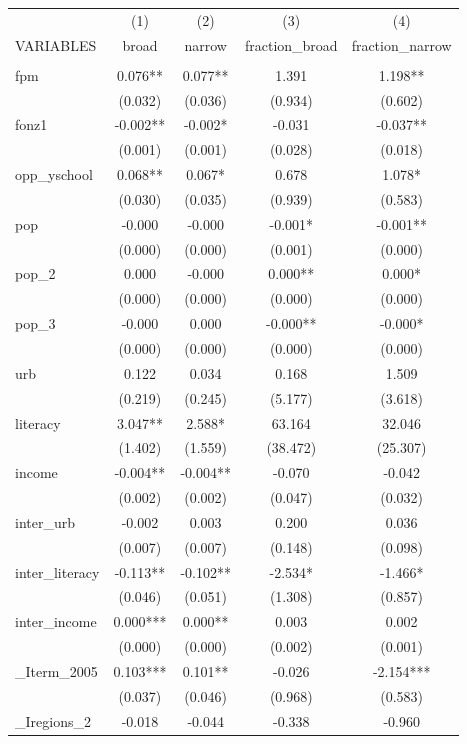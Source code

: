 \documentclass[]{article}
\begin{document}
\begin{tabular}{lcccc} \hline
 & (1) & (2) & (3) & (4) \\
VARIABLES & broad & narrow & fraction\_broad & fraction\_narrow \\ \hline
 &  &  &  &  \\
fpm & 0.076** & 0.077** & 1.391 & 1.198** \\
 & (0.032) & (0.036) & (0.934) & (0.602) \\
fonz1 & -0.002** & -0.002* & -0.031 & -0.037** \\
 & (0.001) & (0.001) & (0.028) & (0.018) \\
opp\_yschool & 0.068** & 0.067* & 0.678 & 1.078* \\
 & (0.030) & (0.035) & (0.939) & (0.583) \\
pop & -0.000 & -0.000 & -0.001* & -0.001** \\
 & (0.000) & (0.000) & (0.001) & (0.000) \\
pop\_2 & 0.000 & -0.000 & 0.000** & 0.000* \\
 & (0.000) & (0.000) & (0.000) & (0.000) \\
pop\_3 & -0.000 & 0.000 & -0.000** & -0.000* \\
 & (0.000) & (0.000) & (0.000) & (0.000) \\
urb & 0.122 & 0.034 & 0.168 & 1.509 \\
 & (0.219) & (0.245) & (5.177) & (3.618) \\
literacy & 3.047** & 2.588* & 63.164 & 32.046 \\
 & (1.402) & (1.559) & (38.472) & (25.307) \\
income & -0.004** & -0.004** & -0.070 & -0.042 \\
 & (0.002) & (0.002) & (0.047) & (0.032) \\
inter\_urb & -0.002 & 0.003 & 0.200 & 0.036 \\
 & (0.007) & (0.007) & (0.148) & (0.098) \\
inter\_literacy & -0.113** & -0.102** & -2.534* & -1.466* \\
 & (0.046) & (0.051) & (1.308) & (0.857) \\
inter\_income & 0.000*** & 0.000** & 0.003 & 0.002 \\
 & (0.000) & (0.000) & (0.002) & (0.001) \\
\_Iterm\_2005 & 0.103*** & 0.101** & -0.026 & -2.154*** \\
 & (0.037) & (0.046) & (0.968) & (0.583) \\
\_Iregions\_2 & -0.018 & -0.044 & -0.338 & -0.960 \\

\end{tabular}
\end{document}

